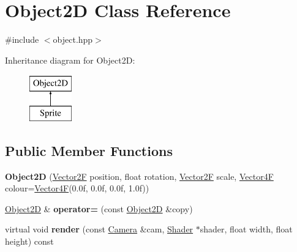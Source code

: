 \hypertarget{class_object2_d}{}\section{Object2D Class Reference}
\label{class_object2_d}


{\ttfamily \#include $<$object.\+hpp$>$}

Inheritance diagram for Object2D\+:\begin{figure}[H]
\begin{center}
\leavevmode
\includegraphics[height=2.000000cm]{class_object2_d}
\end{center}
\end{figure}
\subsection*{Public Member Functions}
\begin{DoxyCompactItemize}
\item 
\mbox{\label{class_object2_d_a7d116f8ebc5760f7362e59651d70a6b1}} 
{\bfseries Object2D} (\mbox{\hyperlink{class_vector2}{Vector2F}} position, float rotation, \mbox{\hyperlink{class_vector2}{Vector2F}} scale, \mbox{\hyperlink{class_vector4}{Vector4F}} colour=\mbox{\hyperlink{class_vector4}{Vector4F}}(0.\+0f, 0.\+0f, 0.\+0f, 1.\+0f))
\item 
\mbox{\label{class_object2_d_a2d0b0a3ca540db7062753b858719f288}} 
\mbox{\hyperlink{class_object2_d}{Object2D}} \& {\bfseries operator=} (const \mbox{\hyperlink{class_object2_d}{Object2D}} \&copy)
\item 
\mbox{\label{class_object2_d_a49808683be9af9b5e73da7bc3b37dffd}} 
virtual void {\bfseries render} (const \mbox{\hyperlink{class_camera}{Camera}} \&cam, \mbox{\hyperlink{class_shader}{Shader}} $\ast$shader, float width, float height) const
\end{DoxyCompactItemize}
